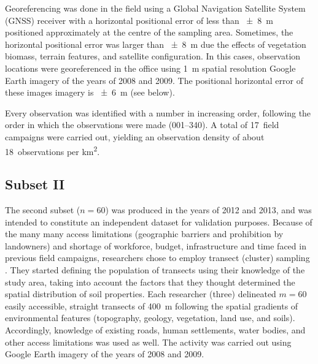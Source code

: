Georeferencing was done in the field using a Global Navigation Satellite System (GNSS) receiver with a 
horizontal positional error of less than \SI{\pm8}{\metre} positioned approximately at the centre of the
sampling area. Sometimes, the horizontal positional error was larger than \SI{\pm8}{\metre} due the effects
of vegetation biomass, terrain features, and satellite configuration. In this cases, observation locations 
were georeferenced in the office using \SI{1}{\metre} spatial resolution Google Earth\textregistered{} 
imagery of the years of 2008 and 2009. The positional horizontal error of these images imagery is 
\SI{\pm6}{\metre} (see below).

Every observation was identified with a number in increasing order, following the order in which 
the observations were made (\num{001}--\num{340}). A total of \num{17}~field campaigns were carried out,
yielding an observation density of about \num{18}~observations per \si{\kilo\metre\squared}.

\tocless\subsection{Subset II}

The second subset ($n = 60$) was produced in the years of \num{2012} and \num{2013}, and was intended to 
constitute an independent dataset for validation purposes. Because of the many many access limitations 
(geographic barriers and prohibition by landowners) and shortage of workforce, budget, infrastructure and 
time faced in previous field campaigns, researchers chose to employ transect (cluster) sampling 
\cite{MiguelEtAl2012,Moura-BuenoEtAl2012,Samuel-RosaEtAl2013}. They started defining the population of 
transects using their knowledge of the study area, taking into account the factors that they thought 
determined the spatial distribution of soil properties. Each researcher (three) delineated $m = 60$ easily 
accessible, straight transects of \SI{400}{\metre} following the spatial gradients of environmental features 
(topography, geology, vegetation, land use, and soils). Accordingly, knowledge of existing roads, human 
settlements, water bodies, and other access limitations was used as well. The activity was carried out using 
Google Earth\textregistered{} imagery of the years of \num{2008} and \num{2009}.


